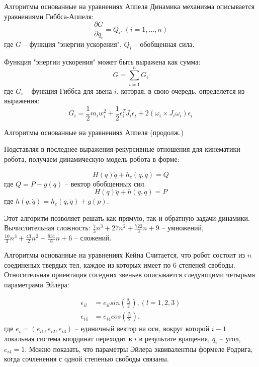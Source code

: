 \documentclass[newPxFont,numfooter,sectionpages]{beamer}
\begin{document}
\begin{frame}{Алгоритмы основанные на уравнениях Аппеля}
Динамика механизма описывается уравнениями Гиббса-Аппеля:
\begin{equation*}
\frac{\partial G}{\partial \ddot q_i} = Q_i, (i=1,...,n)
\end{equation*}
где $G$ -- функция "энергии ускорения", $Q_i$ -- обобщенная сила.

Функция "энергии ускорения" может быть выражена как сумма:
\begin{equation*}
G = \sum_{i=1}^n G_i
\end{equation*}
где $G_i$ -- функция Гиббса для звена $i$, которая, в свою очередь, определется из выражения:
\begin{equation*}
G_i = \frac{1}{2} m_i w_i^2 + \frac{1}{2} \epsilon_i^T J_i \epsilon_i + 2 (\omega_i \times J_i \omega_i) \epsilon_i
\end{equation*}

\end{frame}

\begin{frame}{Алгоритмы основанные на уравнениях Аппеля (продолж.)}

	Подставляя в последнее выражения рекурсивные отношения для кинематики робота, получаем динамическую модель робота в форме:
	
	\begin{equation*} \label{eq8}
	H(q) \ddot q + h_c (q, \dot q) = Q
	\end{equation*}
	где $Q = P - g(q)$ -- вектор обобщенных сил.
	\begin{equation*}
	H(q) \ddot q + h (q, \dot q) = P
	\end{equation*}
	где $h (q, \dot q) = h_c (q, \dot q) + g(p)$.
	
	Этот алгоритм позволяет решать как прямую, так и обратную задачи динамики. Вычислительная сложность: $\frac{7}{3} n^3 + 27 n^2 + \frac{722}{3} n + 9$ -- умножений, $\frac{10}{3} n^3 + \frac{43}{2} n^2 + \frac{931}{6} n + 6$ -- сложений.
\end{frame}


\begin{frame}{Алгоритмы основанные на уравнениях Кейна}
	Считается, что робот состоит из $n$ соединеных твердых тел, каждое из которых имеет по 6 степеней свободы. Относительная ориентация соседних звеньев описывается следующими четырьмя параметрами Эйлера:
	
	\begin{align*}
	\epsilon_{il} &= e_{il} sin (\frac{q_i}{2}), (l=1,2,3)\\
	\epsilon_{i4} &= e_{i4} cos (\frac{q_i}{2}). 
	\end{align*}
	где $e_i = (e_{i1}, e_{i2}, e_{i3})$ -- единичный вектор на оси, вокруг которой $i-1$ локальная система координат переходит в $i$ в результате вращения, $q_i$ -- угол, $e_{i4} = 1$. Можно показать, что параметры Эйлера эквивалентны формеле Родрига, когда сочленения с одной степенью свободы связаны. 
\end{frame}
\end{document}
